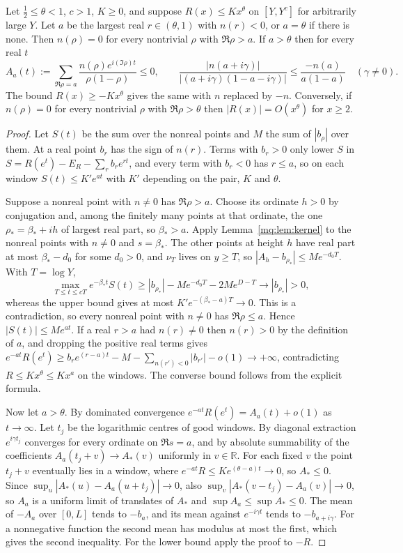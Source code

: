\begin{theorem}\label{mq:thm:windowcombo}
Let $\frac12\le\theta<1$, $c>1$, $K\ge0$, and suppose $R(x)\le Kx^\theta$ on $[Y,Y^c]$ for arbitrarily large $Y$. Let $a$ be the largest real $r\in(\theta,1)$ with $n(r)<0$, or $a=\theta$ if there is none. Then $n(\rho)=0$ for every nontrivial $\rho$ with $\Re\rho>a$. If $a>\theta$ then for every real $t$
\[
A_a(t):=\sum_{\Re\rho=a}\frac{n(\rho)e^{i(\Im\rho)t}}{\rho(1-\rho)}\le0,\qquad\frac{|n(a+i\gamma)|}{|(a+i\gamma)(1-a-i\gamma)|}\le\frac{-n(a)}{a(1-a)}\quad(\gamma\ne0).
\]
The bound $R(x)\ge-Kx^\theta$ gives the same with $n$ replaced by $-n$. Conversely, if $n(\rho)=0$ for every nontrivial $\rho$ with $\Re\rho>\theta$ then $|R(x)|=O(x^\theta)$ for $x\ge2$.
\end{theorem}

\begin{proof}
Let $S(t)$ be the sum over the nonreal points and $M$ the sum of $|b_\rho|$ over them. At a real point $b_r$ has the sign of $n(r)$. Terms with $b_r>0$ only lower $S$ in $S=R(e^t)-E_R-\sum_rb_re^{rt}$, and every term with $b_r<0$ has $r\le a$, so on each window $S(t)\le K'e^{at}$ with $K'$ depending on the pair, $K$ and $\theta$.

Suppose a nonreal point with $n\ne0$ has $\Re\rho>a$. Choose its ordinate $h>0$ by conjugation and, among the finitely many points at that ordinate, the one $\rho_*=\beta_*+ih$ of largest real part, so $\beta_*>a$. Apply Lemma~\ref{mq:lem:kernel} to the nonreal points with $n\ne0$ and $s=\beta_*$. The other points at height $h$ have real part at most $\beta_*-d_0$ for some $d_0>0$, and $\nu_T$ lives on $y\ge T$, so $|A_h-b_{\rho_*}|\le Me^{-d_0T}$. With $T=\log Y$,
\[
\max_{T\le t\le cT}e^{-\beta_*t}S(t)\ge|b_{\rho_*}|-Me^{-d_0T}-2Me^{D-T}\to|b_{\rho_*}|>0,
\]
whereas the upper bound gives at most $K'e^{-(\beta_*-a)T}\to0$. This is a contradiction, so every nonreal point with $n\ne0$ has $\Re\rho\le a$. Hence $|S(t)|\le Me^{at}$. If a real $r>a$ had $n(r)\ne0$ then $n(r)>0$ by the definition of $a$, and dropping the positive real terms gives $e^{-at}R(e^t)\ge b_re^{(r-a)t}-M-\sum_{n(r')<0}|b_{r'}|-o(1)\to+\infty$, contradicting $R\le Kx^\theta\le Kx^a$ on the windows. The converse bound follows from the explicit formula.

Now let $a>\theta$. By dominated convergence $e^{-at}R(e^t)=A_a(t)+o(1)$ as $t\to\infty$. Let $t_j$ be the logarithmic centres of good windows. By diagonal extraction $e^{i\gamma t_j}$ converges for every ordinate on $\Re s=a$, and by absolute summability of the coefficients $A_a(t_j+v)\to A_*(v)$ uniformly in $v\in\mathbb R$. For each fixed $v$ the point $t_j+v$ eventually lies in a window, where $e^{-at}R\le Ke^{(\theta-a)t}\to0$, so $A_*\le0$. Since $\sup_u|A_*(u)-A_a(u+t_j)|\to0$, also $\sup_v|A_*(v-t_j)-A_a(v)|\to0$, so $A_a$ is a uniform limit of translates of $A_*$ and $\sup A_a\le\sup A_*\le0$. The mean of $-A_a$ over $[0,L]$ tends to $-b_a$, and its mean against $e^{-i\gamma t}$ tends to $-b_{a+i\gamma}$. For a nonnegative function the second mean has modulus at most the first, which gives the second inequality. For the lower bound apply the proof to $-R$.
\end{proof}

